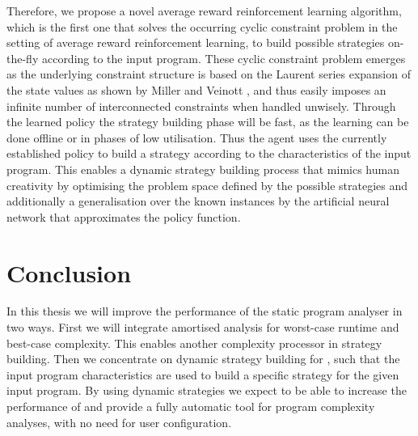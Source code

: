 \documentclass[envcountsame]{llncs}
\begin{document}
Therefore, we propose a novel average reward reinforcement learning algorithm, which is the first
one that solves the occurring cyclic constraint problem in the setting of average reward
reinforcement learning, to build possible strategies on-the-fly according to the input program.
These cyclic constraint problem emerges as the underlying constraint structure is based on the
Laurent series expansion of the state values as shown by Miller and Veinott
\cite{miller1969discrete}, and thus easily imposes an infinite number of interconnected constraints
when handled unwisely. Through the learned policy the strategy building phase will be fast, as the
learning can be done offline or in phases of low utilisation. Thus the agent uses the currently
established policy to build a strategy according to the characteristics of the input program. This
enables a dynamic strategy building process that mimics human creativity by optimising the problem
space defined by the possible strategies and additionally a generalisation over the known instances
by the artificial neural network that approximates the policy function.


\section{Conclusion}

In this thesis we will improve the performance of the static program analyser \tct{} in two ways.
First we will integrate amortised analysis for worst-case runtime and best-case complexity. This
enables another complexity processor in \tct{} strategy building. Then we concentrate on dynamic
strategy building for \tct{}, such that the input program characteristics are used to build a
specific strategy for the given input program. By using dynamic strategies we expect to be able to
increase the performance of \tct{} and provide a fully automatic tool for program complexity
analyses, with no need for user configuration.






\appendix
\end{document}
